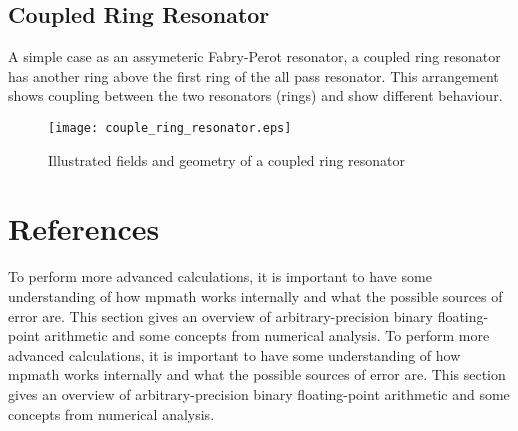 \subsection{Coupled Ring Resonator}
A simple case as an assymeteric Fabry-Perot resonator, a coupled ring resonator has another ring above the first ring of the all pass resonator. This arrangement shows coupling between the two resonators (rings) and show different behaviour. 
\begin{figure}[h]
\centering
\texttt{[image: couple\_ring\_resonator.eps]}
\caption{Illustrated fields and geometry of a coupled ring resonator}
\end{figure}

\newpage
\section*{References}

To perform more advanced calculations, it is important to have some understanding of how mpmath works internally and what the possible sources of error are. This section gives an overview of arbitrary-precision binary floating-point arithmetic and some concepts from numerical analysis.
To perform more advanced calculations, it is important to have some understanding of how mpmath works internally and what the possible sources of error are. This section gives an overview of arbitrary-precision binary floating-point arithmetic and some concepts from numerical analysis.
